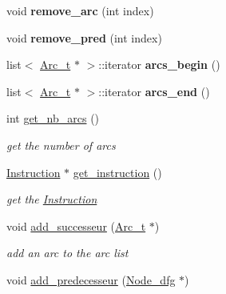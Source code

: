 \begin{DoxyCompactItemize}
void {\bfseries remove\+\_\+arc} (int index)
\item 
\mbox{\label{class_node__dfg_a0f65316cde0b35e7755d4ebf009b009b}} 
void {\bfseries remove\+\_\+pred} (int index)
\item 
\mbox{\label{class_node__dfg_a6ebd568efb70f729f6e355cdd46a5185}} 
list$<$ \mbox{\hyperlink{struct_arc__t}{Arc\+\_\+t}} $\ast$ $>$\+::iterator {\bfseries arcs\+\_\+begin} ()
\item 
\mbox{\label{class_node__dfg_a5a49217bcb16aaf7e94e4e156d9a9d53}} 
list$<$ \mbox{\hyperlink{struct_arc__t}{Arc\+\_\+t}} $\ast$ $>$\+::iterator {\bfseries arcs\+\_\+end} ()
\item 
\mbox{\label{class_node__dfg_a85d42a5cc1d6feacf403a8569a813074}} 
int \mbox{\hyperlink{class_node__dfg_a85d42a5cc1d6feacf403a8569a813074}{get\+\_\+nb\+\_\+arcs}} ()
\begin{DoxyCompactList}\small\item\em get the number of arcs \end{DoxyCompactList}\item 
\mbox{\label{class_node__dfg_a8f20c21a0ffb2e224cc426148362c249}} 
\mbox{\hyperlink{class_instruction}{Instruction}} $\ast$ \mbox{\hyperlink{class_node__dfg_a8f20c21a0ffb2e224cc426148362c249}{get\+\_\+instruction}} ()
\begin{DoxyCompactList}\small\item\em get the \mbox{\hyperlink{class_instruction}{Instruction}} \end{DoxyCompactList}\item 
\mbox{\label{class_node__dfg_add9d669804bc8ad4a4b806221d9ef9e9}} 
void \mbox{\hyperlink{class_node__dfg_add9d669804bc8ad4a4b806221d9ef9e9}{add\+\_\+successeur}} (\mbox{\hyperlink{struct_arc__t}{Arc\+\_\+t}} $\ast$)
\begin{DoxyCompactList}\small\item\em add an arc to the arc list \end{DoxyCompactList}\item 
\mbox{\label{class_node__dfg_a8cc89b32dbe15bcf399725955a643551}} 
void \mbox{\hyperlink{class_node__dfg_a8cc89b32dbe15bcf399725955a643551}{add\+\_\+predecesseur}} (\mbox{\hyperlink{class_node__dfg}{Node\+\_\+dfg}} $\ast$)

\end{DoxyCompactItemize}
